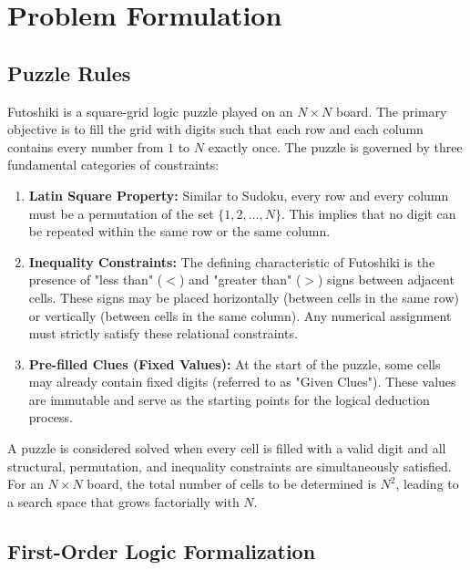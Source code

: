 \section{Problem Formulation}

\subsection{Puzzle Rules}
Futoshiki is a square-grid logic puzzle played on an $N \times N$ board. The primary objective is to fill the grid with digits such that each row and each column contains every number from $1$ to $N$ exactly once. The puzzle is governed by three fundamental categories of constraints:
\begin{enumerate}
    \item \textbf{Latin Square Property:} Similar to Sudoku, every row and every column must be a permutation of the set $\{1, 2, \dots, N\}$. This implies that no digit can be repeated within the same row or the same column.
    
    \item \textbf{Inequality Constraints:} The defining characteristic of Futoshiki is the presence of "less than" ($<$) and "greater than" ($>$) signs between adjacent cells. These signs may be placed horizontally (between cells in the same row) or vertically (between cells in the same column). Any numerical assignment must strictly satisfy these relational constraints.
    
    \item \textbf{Pre-filled Clues (Fixed Values):} At the start of the puzzle, some cells may already contain fixed digits (referred to as "Given Clues"). These values are immutable and serve as the starting points for the logical deduction process.
\end{enumerate}

A puzzle is considered solved when every cell is filled with a valid digit and all structural, permutation, and inequality constraints are simultaneously satisfied. For an $N \times N$ board, the total number of cells to be determined is $N^2$, leading to a search space that grows factorially with $N$.

\subsection{First-Order Logic Formalization}
